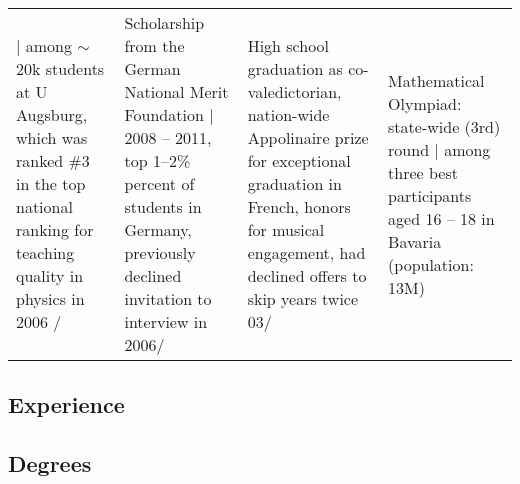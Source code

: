 \begin{longtable}[t]{R{\widthC} p{\widthB}}
{\footnotesize$\vert$ among $\sim$20k students at U Augsburg, which was ranked \#3 in the top national ranking for teaching quality in physics in 2006}  /
& Scholarship from the German National Merit Foundation {\footnotesize$\vert$ 2008 -- 2011, top 1--2\% percent of students in Germany, previously declined invitation to interview in 2006}/
&
High school graduation as co-valedictorian, nation-wide Appolinaire prize for exceptional graduation in French, honors for musical engagement, had declined offers to skip years twice\newline
03/
& Mathematical Olympiad: state-wide (3rd) round {\footnotesize$\vert$ among three best participants aged 16 -- 18 in Bavaria (population: 13M)}
\end{longtable}

\newpage

\subsection*{Experience }
\vspace{.0em}


\subsection*{Degrees}\vspace{-1em}

